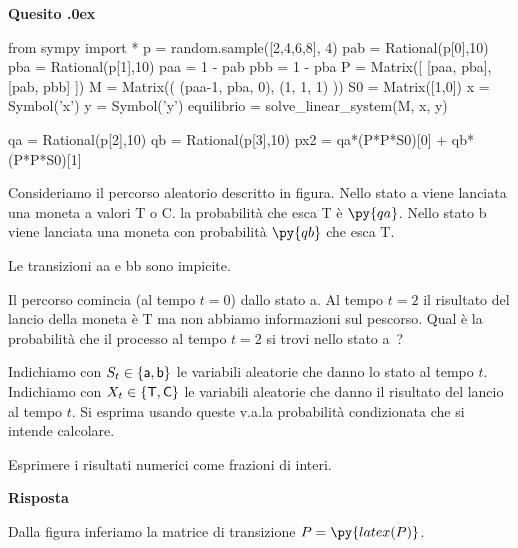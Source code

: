 \documentclass[11pt,twoside,a4paper]{article}
\newcounter{quesito}
\newenvironment{question}{\bigskip\addtocounter{quesito}{1}\bigskip\bigskip\par\textbf{Quesito \thequesito.\kern0ex}}{\par\vspace{\parskip}}
\newenvironment{answer}{\par\textbf{Risposta\quad}}{\par\vspace{\parskip}}
\begin{document}
\begin{question}%
\def\Pr{{\rm Pr\,}}
\def\pyl#1{\py{latex(#1)}}
\everymath{\displaystyle}
\renewcommand{\arraystretch}{2}
\begin{pycode}
from sympy import *
p = random.sample([2,4,6,8], 4)
pab = Rational(p[0],10)
pba = Rational(p[1],10)
paa = 1 - pab
pbb = 1 - pba
P  = Matrix([ [paa, pba], 
              [pab, pbb] ])
M  = Matrix(( (paa-1, pba, 0),
             (1,     1,   1) ))
S0 = Matrix([1,0])
x = Symbol('x')
y = Symbol('y')
equilibrio = solve_linear_system(M, x, y)



qa = Rational(p[2],10)
qb = Rational(p[3],10)
px2 = qa*(P*P*S0)[0] + qb*(P*P*S0)[1] 
\end{pycode}
Consideriamo il percorso aleatorio descritto in figura. Nello stato {\sf a} viene lanciata una moneta a valori {\sf T} o {\sf C}. la probabilità che esca {\sf T} è $\py{qa}$. Nello stato {\sf b} viene lanciata una moneta con probabilità $\py{qb}$ che esca {\sf T}.

\hfil
{}
\hfil Le transizioni {\sf aa} e {\sf bb} sono impicite.

Il percorso comincia (al tempo $t{=}0$) dallo stato {\sf a}. Al tempo $t=2$ il risultato del lancio della moneta è {\sf T} ma non abbiamo informazioni sul pescorso. Qual è la probabilità che il processo al tempo $t{=}2$ si trovi nello stato {\sf a}~?

Indichiamo con $S_t\in\{{\sf a}, {\sf b}\}$ le variabili aleatorie che danno lo stato al tempo $t$. Indichiamo con $X_t\in\{{\sf T}, {\sf C}\}$ le variabili aleatorie che danno il risultato del lancio al tempo $t$. Si esprima usando queste v.a.\@ la probabilità condizionata che si intende calcolare. 

Esprimere i risultati numerici come frazioni di interi.


\begin{answer}

Dalla figura inferiamo la matrice di transizione $P=\pyl{P}$. 


\end{answer}
\end{question}
\end{document}
